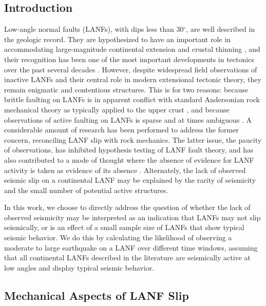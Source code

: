 \documentclass[twocolumn,grl]{AGUTeX}
\begin{document}
\begin{article}

\section{Introduction}
Low-angle normal faults (LANFs), with dips less than 30$^\circ$, are well described in the geologic record. They are hypothesized to have an important role in accommodating large-magnitude continental extension \citep{howard1987crustal} and crustal thinning \citep{lister1986detachment}, and their recognition has been one of the most important developments in tectonics over the past several decades \citep{wernicke2009detachment}. However, despite widespread field observations of inactive LANFs and their central role in modern extensional tectonic theory, they remain enigmatic and contentious structures. This is for two reasons: because brittle faulting on LANFs is in apparent conflict with standard Andersonian rock mechanical theory as typically applied to the upper crust \citep{axen2004lanfmech}, and because observations of active faulting on LANFs is sparse and at times ambiguous \citep{wernicke1995seis,}. A considerable amount of research has been performed to address the former concern, reconciling LANF slip with rock mechanics. The latter issue, the paucity of observations, has inhibited hypothesis testing of LANF fault theory, and has also contributed to a mode of thought where the absence of evidence for LANF activity is taken as evidence of its absence \citep{jackson1987, collettinisibson2001}. Alternately, the lack of observed seismic slip on a continental LANF may be explained by the rarity of seismicity and the small number of potential active structures.

In this work, we choose to directly address the question of whether the lack of observed seismicity may be interpreted as an indication that LANFs may not slip seismically, or is an effect of a small sample size of LANFs that show typical seismic behavior.  We do this by calculating the likelihood of observing a moderate to large earthquake on a LANF over different time windows, assuming that all continental LANFs described in the literature are seismically active at low angles and display typical seismic behavior.

\subsection{Mechanical Aspects of LANF Slip}




\end{article}
\end{document}
